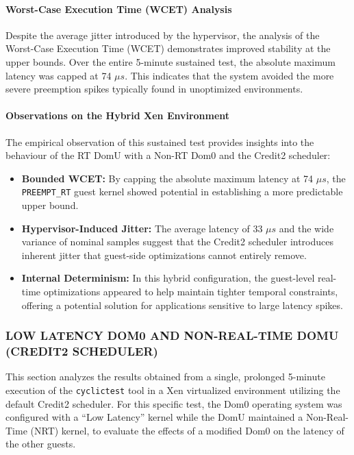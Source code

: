 \paragraph{Worst-Case Execution Time (WCET)
Analysis}\label{worst-case-execution-time-wcet-analysis-10}

Despite the average jitter introduced by the hypervisor, the analysis of
the Worst-Case Execution Time (WCET) demonstrates improved stability at
the upper bounds. Over the entire 5-minute sustained test, the absolute
maximum latency was capped at 74 $\mu s$. This indicates that the system
avoided the more severe preemption spikes typically found in unoptimized
environments.

\paragraph{Observations on the Hybrid Xen
Environment}\label{observations-on-the-hybrid-xen-environment}

The empirical observation of this sustained test provides insights into
the behaviour of the RT DomU with a Non-RT Dom0 and the Credit2
scheduler:

\begin{itemize}
\item
  \textbf{Bounded WCET:} By capping the absolute maximum latency at 74
  $\mu s$, the \texttt{PREEMPT\_RT} guest kernel showed potential in
  establishing a more predictable upper bound.
\item
  \textbf{Hypervisor-Induced Jitter:} The average latency of 33 $\mu s$ and
  the wide variance of nominal samples suggest that the Credit2
  scheduler introduces inherent jitter that guest-side optimizations
  cannot entirely remove.
\item
  \textbf{Internal Determinism:} In this hybrid configuration, the
  guest-level real-time optimizations appeared to help maintain tighter
  temporal constraints, offering a potential solution for applications
  sensitive to large latency spikes.
\end{itemize}

\subsubsection{LOW LATENCY DOM0 AND NON-REAL-TIME DOMU (CREDIT2
SCHEDULER)}\label{low-latency-dom0-and-non-real-time-domu-credit2-scheduler}

This section analyzes the results obtained from a single, prolonged
5-minute execution of the \texttt{cyclictest} tool in a Xen virtualized
environment utilizing the default Credit2 scheduler. For this specific
test, the Dom0 operating system was configured with a ``Low Latency''
kernel while the DomU maintained a Non-Real-Time (NRT) kernel, to
evaluate the effects of a modified Dom0 on the latency of the other
guests.

